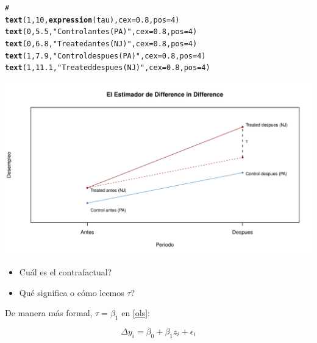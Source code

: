 \documentclass[onesided]{article}\usepackage[]{graphicx}\usepackage[]{color}
\makeatletter
\def\maxwidth{ %
  \ifdim\Gin@nat@width>\linewidth
    \linewidth
  \else
    \Gin@nat@width
  \fi
}
\newcommand{\hlnum}[1]{\textcolor[rgb]{0.686,0.059,0.569}{#1}}%
\newcommand{\hlstr}[1]{\textcolor[rgb]{0.192,0.494,0.8}{#1}}%
\newcommand{\hlcom}[1]{\textcolor[rgb]{0.678,0.584,0.686}{\textit{#1}}}%
\newcommand{\hlstd}[1]{\textcolor[rgb]{0.345,0.345,0.345}{#1}}%
\newcommand{\hlkwc}[1]{\textcolor[rgb]{0.333,0.667,0.333}{#1}}%
\newcommand{\hlkwd}[1]{\textcolor[rgb]{0.737,0.353,0.396}{\textbf{#1}}}%
\newenvironment{kframe}{%
 \def\at@end@of@kframe{}%
 \ifinner\ifhmode%
  \def\at@end@of@kframe{\end{minipage}}%
  \begin{minipage}{\columnwidth}%
 \fi\fi%
 \def\FrameCommand##1{\hskip\@totalleftmargin \hskip-\fboxsep
 \colorbox{shadecolor}{##1}\hskip-\fboxsep
     \hskip-\linewidth \hskip-\@totalleftmargin \hskip\columnwidth}%
 \MakeFramed {\advance\hsize-\width
   \@totalleftmargin\z@ \linewidth\hsize
   \@setminipage}}%
 {\par\unskip\endMakeFramed%
 \at@end@of@kframe}
\newenvironment{knitrout}{}{} %
\makeatother
\begin{document}
\begin{knitrout}
\begin{kframe}
\begin{alltt}
\hlcom{# }
\hlkwd{text}\hlstd{(}\hlnum{1}\hlstd{,} \hlnum{10}\hlstd{,} \hlkwd{expression}\hlstd{(tau),} \hlkwc{cex} \hlstd{=} \hlnum{0.8}\hlstd{,} \hlkwc{pos} \hlstd{=} \hlnum{4}\hlstd{)}
\hlkwd{text}\hlstd{(}\hlnum{0}\hlstd{,} \hlnum{5.5}\hlstd{,} \hlstr{"Control antes (PA)"}\hlstd{,} \hlkwc{cex} \hlstd{=} \hlnum{0.8} \hlstd{,} \hlkwc{pos} \hlstd{=} \hlnum{4}\hlstd{)}
\hlkwd{text}\hlstd{(}\hlnum{0}\hlstd{,} \hlnum{6.8}\hlstd{,} \hlstr{"Treated antes (NJ)"}\hlstd{,} \hlkwc{cex} \hlstd{=} \hlnum{0.8} \hlstd{,} \hlkwc{pos} \hlstd{=} \hlnum{4}\hlstd{)}
\hlkwd{text}\hlstd{(}\hlnum{1}\hlstd{,} \hlnum{7.9}\hlstd{,} \hlstr{"Control despues (PA)"}\hlstd{,} \hlkwc{cex} \hlstd{=} \hlnum{0.8} \hlstd{,} \hlkwc{pos} \hlstd{=} \hlnum{4}\hlstd{)}
\hlkwd{text}\hlstd{(}\hlnum{1}\hlstd{,} \hlnum{11.1}\hlstd{,} \hlstr{"Treated despues (NJ)"}\hlstd{,} \hlkwc{cex} \hlstd{=} \hlnum{0.8} \hlstd{,} \hlkwc{pos} \hlstd{=} \hlnum{4}\hlstd{)}
\end{alltt}
\end{kframe}

{\centering \includegraphics[width=\maxwidth]{figure/dif:dif-1} 

}



\end{knitrout}

\begin{itemize}
\item {\color{red}Cu\'al es el contrafactual?}
\item {\color{red}Qu\'e significa o c\'omo leemos $\tau$?}
\end{itemize}


De manera m\'as formal, $\tau=\beta_{1}$ en \autoref{ols}:

\begin{equation}\label{ols}
\Delta y_{i} = \beta_{0} + \beta_{1}z_{i} + \epsilon_{i}
\end{equation}
\end{document}
